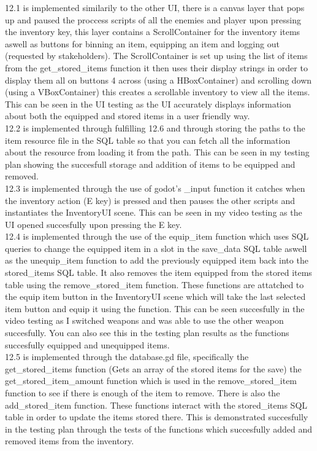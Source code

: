 \documentclass{article}
\begin{document}
        12.1 is implemented similarily to the other UI, there is a canvas layer that pops up and paused the proccess scripts of all the enemies and player upon pressing the inventory key, this layer contains a ScrollContainer for the inventory items aswell as buttons for binning an item, equipping an item and logging out (requested by stakeholders). The ScrollContainer is set up using the list of items from the get\_stored\_items function it then uses their display strings in order to display them all on buttons 4 across (using a HBoxContainer) and scrolling down (using a VBoxContainer) this creates a scrollable inventory to view all the items. This can be seen in the UI testing as the UI accurately displays information about both the equipped and stored items in a user friendly way.\\
        12.2 is implemented through fulfilling 12.6 and through storing the paths to the item resource file in the SQL table so that you can fetch all the information about the resource from loading it from the path. This can be seen in my testing plan showing the succesfull storage and addition of items to be equipped and removed.\\
        12.3 is implemented through the use of godot's \_input function it catches when the inventory action (E key) is pressed and then pauses the other scripts and instantiates the InventoryUI scene. This can be seen in my video testing as the UI opened succesfully upon pressing the E key.\\
        12.4 is implemented through the use of the equip\_item function which uses SQL queries to change the equipped item in a slot in the save\_data SQL table aswell as the unequip\_item function to add the previously equipped item back into the stored\_items SQL table. It also removes the item equipped from the stored items table using the remove\_stored\_item function. These functions are attatched to the equip item button in the InventoryUI scene which will take the last selected item button and equip it using the function. This can be seen succesfully in the video testing as I switched weapons and was able to use the other weapon succesfully. You can also see this in the testing plan results as the functions succesfully equipped and unequipped items.\\
        12.5 is implemented through the database.gd file, specifically the get\_stored\_items function (Gets an array of the stored items for the save) the get\_stored\_item\_amount function which is used in the remove\_stored\_item function to see if there is enough of the item to remove. There is also the add\_stored\_item function. These functions interact with the stored\_items SQL table in order to update the items stored there. This is demonstrated succesfully in the testing plan through the tests of the functions which succesfully added and removed items from the inventory.\\
\end{document}

